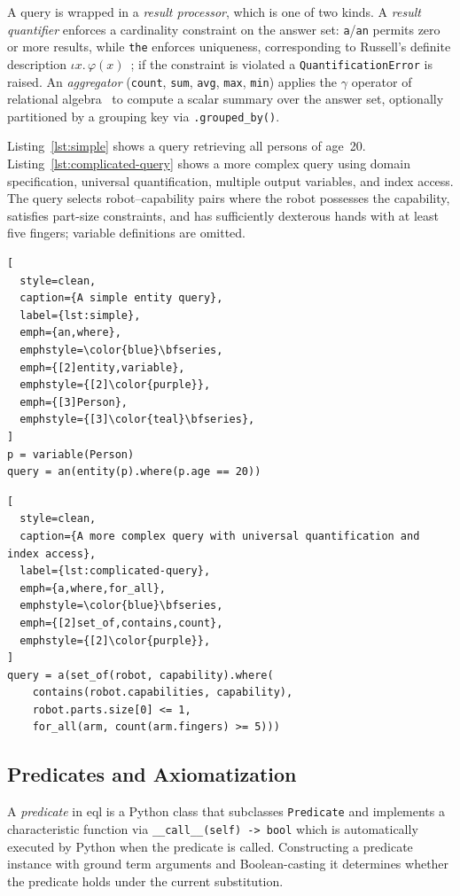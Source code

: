 \documentclass[a4paper,fleqn]{cas-sc}
\begin{document}
A query is wrapped in a \emph{result processor}, which is one of two kinds.
A \emph{result quantifier} enforces a cardinality constraint on the answer
set: \texttt{a}/\texttt{an} permits zero or more results, while \texttt{the}
enforces uniqueness, corresponding to Russell's definite description $\iota
x.\,\varphi(x)$~\citep{WhiteheadRussell1910}; if the constraint is violated a
\texttt{QuantificationError} is raised. An \emph{aggregator}
(\texttt{count}, \texttt{sum}, \texttt{avg}, \texttt{max}, \texttt{min})
applies the $\gamma$ operator of relational
algebra~\citep{Klug1982,AbiteboulHullVianu1995} to compute a scalar summary
over the answer set, optionally partitioned by a grouping key via
\texttt{.grouped\_by()}.

Listing~\ref{lst:simple} shows a query retrieving all persons of age~20.
Listing~\ref{lst:complicated-query} shows a more complex query using domain
specification, universal quantification, multiple output variables, and index
access. The query selects robot--capability pairs where the robot possesses
the capability, satisfies part-size constraints, and has sufficiently dexterous
hands with at least five fingers; variable definitions are omitted.

\begin{lstlisting}[
  style=clean,
  caption={A simple entity query},
  label={lst:simple},
  emph={an,where},
  emphstyle=\color{blue}\bfseries,
  emph={[2]entity,variable},
  emphstyle={[2]\color{purple}},
  emph={[3]Person},
  emphstyle={[3]\color{teal}\bfseries},
]
p = variable(Person)
query = an(entity(p).where(p.age == 20))
\end{lstlisting}

\begin{lstlisting}[
  style=clean,
  caption={A more complex query with universal quantification and index access},
  label={lst:complicated-query},
  emph={a,where,for_all},
  emphstyle=\color{blue}\bfseries,
  emph={[2]set_of,contains,count},
  emphstyle={[2]\color{purple}},
]
query = a(set_of(robot, capability).where(
    contains(robot.capabilities, capability),
    robot.parts.size[0] <= 1,
    for_all(arm, count(arm.fingers) >= 5)))
\end{lstlisting}


\subsection{Predicates and Axiomatization}
\label{ssec:eql_predicates}

A \emph{predicate} in \ac{eql} is a Python class that subclasses
\texttt{Predicate} and implements a characteristic function via
\texttt{\_\_call\_\_(self) -> bool} which is automatically executed by Python when the predicate is called. Constructing a predicate instance with
ground term arguments and Boolean-casting it determines whether the predicate
holds under the current substitution.
\end{document}
